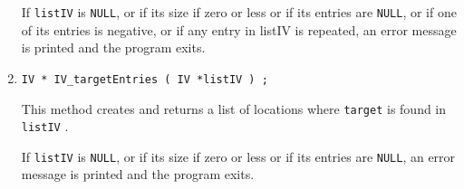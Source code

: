 \begin{enumerate}
\par {}
If {\tt listIV} is {\tt NULL}, 
or if its size if zero or less or if its entries are {\tt NULL},
or if one of its entries is negative,
or if any entry in listIV is repeated,
an error message is printed and the program exits.
\item
\begin{verbatim}
IV * IV_targetEntries ( IV *listIV ) ;
\end{verbatim}
This method creates and returns a list of 
locations where {\tt target} is found in {\tt listIV} .
\par {}
If {\tt listIV} is {\tt NULL}, 
or if its size if zero or less or if its entries are {\tt NULL},
an error message is printed and the program exits.
\end{enumerate}
\par
